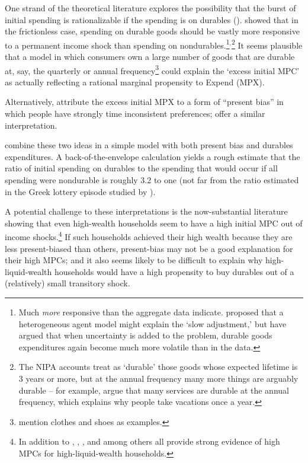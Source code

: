 \documentclass[\econtexRoot/HAFiscal]{subfiles}
\begin{document}
One strand of the theoretical literature explores the possibility that the burst of initial spending is rationalizable if the spending is on durables  (\cite{bcShocksStocks}).  \cite{mankiw:durgoods} showed that in the frictionless case, spending on durable goods should be vastly more responsive to a permanent income shock than spending on nondurables.\footnote{Much \textit{more} responsive than the aggregate data indicate.  \cite{caballeroDurable} proposed that a heterogeneous agent model might explain the `slow adjustment,' but \cite{cdSs} have argued that when uncertainty is added to the problem, durable goods expenditures again become much more volatile than in the data.}$^{,}$\footnote{The NIPA accounts treat as `durable' those goods whose expected lifetime is 3 years or more, but at the annual frequency many more things are arguably durable -- for example, \cite{hkpMemorable} argue that many services are durable at the annual frequency, which explains why people take vacations once a year.}  It seems plausible that a model in which consumers own a large number of goods that are durable at, say, the quarterly or annual frequency\footnote{\cite{bdTimeSeriesC} mention clothes and shoes as examples.} could explain the `excess initial MPC' as actually reflecting a rational marginal propensity to Expend (MPX).  

\hypertarget{indarte2024explains}{}

Alternatively, \cite{indarte2024explains} attribute the excess initial MPX to a form of ``present bias'' in which people have strongly time inconsistent preferences; \cite{lmmPresentBias} offer a similar interpretation.  

\cite{laibson2022simple} combine these two ideas in a simple model with both present bias and durables expenditures.  A back-of-the-envelope calculation yields a rough estimate that the ratio of initial spending on durables to the spending that would occur if all spending were nondurable is roughly 3.2 to one (not far from the ratio estimated in the Greek lottery episode studied by \cite{kotsogiannisMPCs}).

A potential challenge to these interpretations is the now-substantial literature showing that even high-wealth households seem to have a high initial MPC out of income shocks.\footnote{In addition to \cite{fagereng_mpc_2021}, \cite{graham2024mental}, \cite{crawley2023MicroMacro}, and \cite{kueng2018excess} among others all provide strong evidence of high MPCs for high-liquid-wealth households.}  If such households achieved their high wealth because they are less present-biased than others, present-bias may not be a good explanation for their high MPCs; and it also seems likely to be difficult to explain why high-liquid-wealth households would have a high propensity to buy durables out of a (relatively) small transitory shock.
\end{document}
